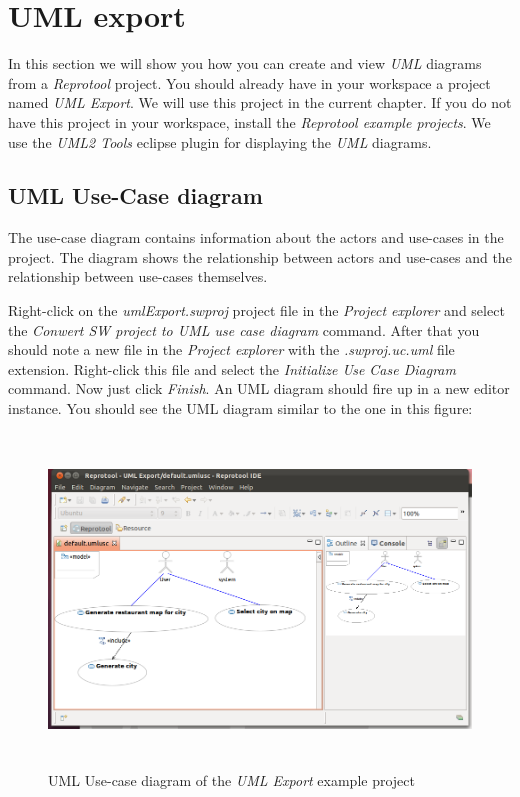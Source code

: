 \section{UML export}

In this section we will show you how you can create and view \emph{UML} diagrams from a \emph{Reprotool} project. You should already
have in your workspace a project named \emph{UML Export}. We will use this project in the current chapter. If you do not
have this project in your workspace, install the \emph{Reprotool example projects}. We use the
\emph{UML2 Tools} eclipse plugin for displaying the \emph{UML} diagrams.

\subsection{UML Use-Case diagram}
The use-case diagram contains information about the actors and use-cases in the project. The diagram shows the relationship between
actors and use-cases and the relationship between use-cases themselves.

Right-click on the \emph{umlExport.swproj} project file in the \emph{Project explorer} and select the \emph{Conwert SW project to UML use case
diagram} command. After that you should note a new file in the \emph{Project explorer} with the \emph{.swproj.uc.uml} file extension.
Right-click this file and select the \emph{Initialize Use Case Diagram} command. Now just click \emph{Finish}. An UML diagram should
fire up in a new editor instance. You should see the UML diagram similar to the one in this figure:

\begin{figure}[ht]
  \centering
  \includegraphics[height=250pt]{images/reprotoolUCDiagram}
  \caption{UML Use-case diagram of the \emph{UML Export} example project}
  \label{fig:reprotoolUCDiagram}
\end{figure}

